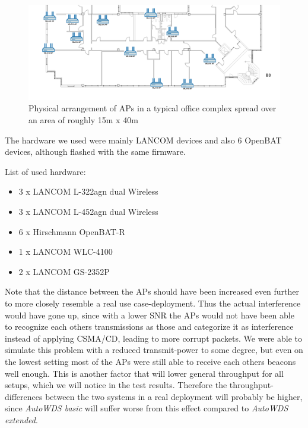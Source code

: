       \begin{figure}[h!]
	\centering
	\includegraphics[width=\columnwidth]{figures/Lancom-flur-withaps}
	\caption{Physical arrangement of APs in a typical office complex spread over an area of roughly 15m x 40m}
	\label{fig:2ndfloor}
      \end{figure}
      
      The hardware we used were mainly LANCOM devices and also 6 OpenBAT devices, although flashed with the same firmware.
     
      List of used hardware:
      \begin{itemize}
	\item 3 x LANCOM L-322agn dual Wireless \cite{lancom}
	\item 3 x LANCOM L-452agn dual Wireless
	\item 6 x Hirschmann OpenBAT-R
	\item 1 x LANCOM WLC-4100
	\item 2 x LANCOM GS-2352P
      \end{itemize}
      
      Note that the distance between the APs should have been increased even further to more closely resemble a real use case-deployment.
      Thus the actual interference would have gone up, since with a lower \ac{SNR} the APs would not have been able to recognize each others 
      transmissions as those and categorize it as interference instead of applying CSMA/CD, leading to more corrupt packets.
      We were able to simulate this problem with a reduced transmit-power to some degree,
      but even on the lowest setting most of the APs were still able to receive each others beacons well enough. 
      This is another factor that will lower general throughput for all setups, which we will notice in the test results.
      Therefore the throughput-differences between the two systems in a real deployment will probably be higher, since \textit{AutoWDS basic} will suffer worse from this effect 
      compared to \textit{AutoWDS extended}.
    
